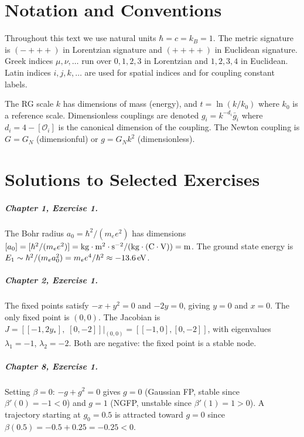 \documentclass[12pt,a4paper,oneside]{book}
\theoremstyle{definition}
\theoremstyle{plain}
\theoremstyle{remark}
\begin{document}
\chapter{Notation and Conventions}

Throughout this text we use natural units $\hbar = c = k_B = 1$. The metric
signature is $(-+++)$ in Lorentzian signature and $(++++)$ in Euclidean
signature. Greek indices $\mu,\nu,\ldots$ run over $0,1,2,3$ in Lorentzian
and $1,2,3,4$ in Euclidean. Latin indices $i,j,k,\ldots$ are used for
spatial indices and for coupling constant labels.

The RG scale $k$ has dimensions of mass (energy), and $t = \ln(k/k_0)$ where
$k_0$ is a reference scale. Dimensionless couplings are denoted $g_i = k^{-d_i}\bar g_i$
where $d_i = 4 - [\mathcal{O}_i]$ is the canonical dimension of the coupling.
The Newton coupling is $G = G_N$ (dimensionful) or $g = G_N k^2$ (dimensionless).

\chapter{Solutions to Selected Exercises}

\paragraph{Chapter 1, Exercise 1.} The Bohr radius $a_0 = \hbar^2/(m_e e^2)$
has dimensions $[a_0] = [\hbar^2/(m_e e^2)] = {\rm kg}\cdot{\rm m}^2\cdot{\rm s}^{-2}/
({\rm kg}\cdot({\rm C}\cdot{\rm V})) = {\rm m}$. The ground state energy is
$E_1 \sim \hbar^2/(m_e a_0^2) = m_e e^4/\hbar^2 \approx -13.6\,{\rm eV}$.

\paragraph{Chapter 2, Exercise 1.} The fixed points satisfy $-x + y^2 = 0$ and
$-2y = 0$, giving $y = 0$ and $x = 0$. The only fixed point is $(0,0)$. The
Jacobian is $J = [[-1, 2y_*],\; [0, -2]]|_{(0,0)} = [[-1,0],[0,-2]]$, with
eigenvalues $\lambda_1 = -1$, $\lambda_2 = -2$. Both are negative: the fixed
point is a stable node.

\paragraph{Chapter 8, Exercise 1.} Setting $\beta = 0$: $-g + g^2 = 0$ gives
$g = 0$ (Gaussian FP, stable since $\beta'(0) = -1 < 0$) and $g = 1$ (NGFP,
unstable since $\beta'(1) = 1 > 0$). A trajectory starting at $g_0 = 0.5$
is attracted toward $g = 0$ since $\beta(0.5) = -0.5 + 0.25 = -0.25 < 0$.
\end{document}
